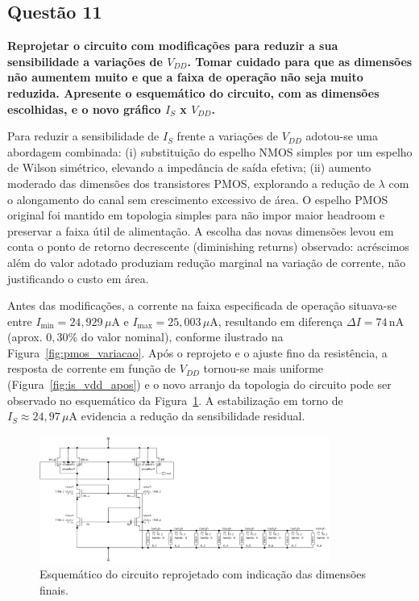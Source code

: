 \documentclass[12pt,a4paper]{article}
\begin{document}
\subsection*{Questão 11}
\begin{BoxQ}
	\textbf{Reprojetar o circuito com modificações para reduzir a sua sensibilidade a variações de $V_{DD}$. Tomar cuidado para que as dimensões não aumentem muito e que a faixa de operação não seja muito reduzida. Apresente o esquemático do circuito, com as dimensões escolhidas, e o novo gráfico $I_S$ x $V_{DD}$.}
\end{BoxQ}

Para reduzir a sensibilidade de $I_S$ frente a variações de $V_{DD}$ adotou-se uma abordagem combinada: (i) substituição do espelho NMOS simples por um espelho de Wilson simétrico, elevando a impedância de saída efetiva; (ii) aumento moderado das dimensões dos transistores PMOS, explorando a redução de $\lambda$ com o alongamento do canal sem crescimento excessivo de área. O espelho PMOS original foi mantido em topologia simples para não impor maior headroom e preservar a faixa útil de alimentação. A escolha das novas dimensões levou em conta o ponto de retorno decrescente (diminishing returns) observado: acréscimos além do valor adotado produziam redução marginal na variação de corrente, não justificando o custo em área.

Antes das modificações, a corrente na faixa especificada de operação situava-se entre $I_{\min}=24{,}929\,\mu\text{A}$ e $I_{\max}=25{,}003\,\mu\text{A}$, resultando em diferença $\Delta I = 74\,\text{nA}$ (aprox. $0{,}30\%$ do valor nominal), conforme ilustrado na Figura~\ref{fig:pmos_variacao}. Após o reprojeto e o ajuste fino da resistência, a resposta de corrente em função de $V_{DD}$ tornou-se mais uniforme (Figura~\ref{fig:is_vdd_apos}) e o novo arranjo da topologia do circuito pode ser observado no esquemático da Figura~\ref{fig:esquematico_q11}. A estabilização em torno de $I_S\approx 24{,}97\,\mu\text{A}$ evidencia a redução da sensibilidade residual.

\begin{figure}[H]
    \centering
    \includegraphics[width=0.85\textwidth]{images/esquematico.png}
    \caption{Esquemático do circuito reprojetado com indicação das dimensões finais.}
    \label{fig:esquematico_q11}
\end{figure}
\end{document}
